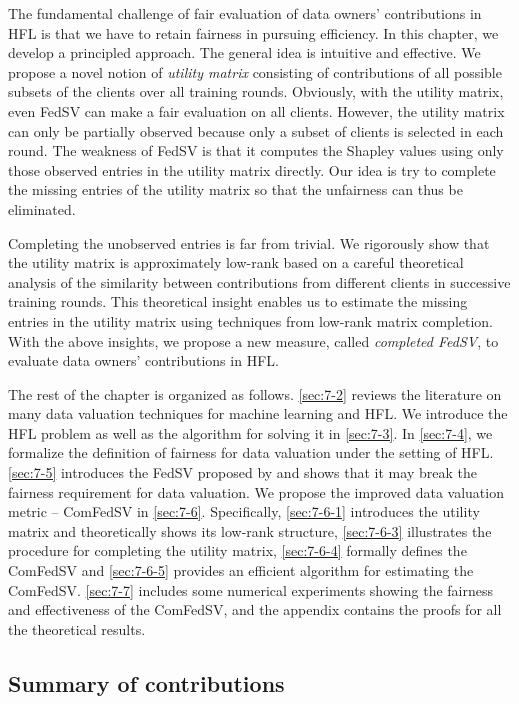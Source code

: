 The fundamental challenge of fair evaluation of data owners' contributions in HFL is that we have to retain fairness in pursuing efficiency. In this chapter, we develop a principled approach. The general idea is intuitive and effective.  We propose a novel notion of \emph{utility matrix} consisting of contributions of all possible subsets of the clients over all training rounds. Obviously, with the utility matrix, even FedSV can make a fair evaluation on all clients.  However, the utility matrix can only be partially observed because only a subset of clients is selected in each round. The weakness of FedSV is that it computes the Shapley values using only those observed entries in the utility matrix directly. Our idea is try to complete the missing entries of the utility matrix so that the unfairness can thus be eliminated. 

Completing the unobserved entries is far from trivial. We rigorously show that the utility matrix is approximately low-rank based on a careful theoretical analysis of the similarity between contributions from different clients in successive training rounds. This theoretical insight enables us to estimate the missing entries in the utility matrix using techniques from low-rank matrix completion.  With the above insights, we propose a new measure, called \emph{completed FedSV}, to evaluate data owners' contributions in HFL. 

The rest of the chapter is organized as follows. \autoref{sec:7-2} reviews the literature on many data valuation techniques for machine learning and HFL. We introduce the HFL problem as well as the algorithm for solving it in \autoref{sec:7-3}. In \autoref{sec:7-4}, we formalize the definition of fairness for data valuation under the setting of HFL. \autoref{sec:7-5} introduces the FedSV proposed by \citet{wang2020principled} and shows that it may break the fairness requirement for data valuation. We propose the improved data valuation metric -- ComFedSV in \autoref{sec:7-6}. Specifically, \autoref{sec:7-6-1} introduces the utility matrix and theoretically shows its low-rank structure, \autoref{sec:7-6-3} illustrates the procedure for completing the utility matrix, \autoref{sec:7-6-4} formally defines the ComFedSV and \autoref{sec:7-6-5} provides an efficient algorithm for estimating the ComFedSV. \autoref{sec:7-7} includes some numerical experiments showing the fairness and effectiveness of the ComFedSV, and the appendix contains the proofs for all the theoretical results. 

\subsection{Summary of contributions}

